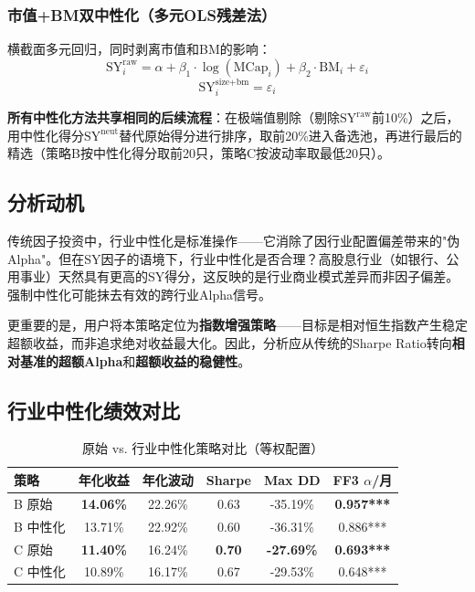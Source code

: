 \documentclass[10pt,a4paper]{ctexart}
\begin{document}
\subsubsection{市值+BM双中性化（多元OLS残差法）}

横截面多元回归，同时剥离市值和BM的影响：
\begin{equation}
\text{SY}_i^{\text{raw}} = \alpha + \beta_1 \cdot \log(\text{MCap}_i) + \beta_2 \cdot \text{BM}_i + \varepsilon_i
\end{equation}
\begin{equation}
\text{SY}_i^{\text{size+bm}} = \varepsilon_i
\end{equation}

\textbf{所有中性化方法共享相同的后续流程}：在极端值剔除（剔除$\text{SY}^{\text{raw}}$前10\%）之后，用中性化得分$\text{SY}^{\text{neut}}$替代原始得分进行排序，取前20\%进入备选池，再进行最后的精选（策略B按中性化得分取前20只，策略C按波动率取最低20只）。

\subsection{分析动机}

传统因子投资中，行业中性化是标准操作——它消除了因行业配置偏差带来的"伪Alpha"。但在SY因子的语境下，行业中性化是否合理？高股息行业（如银行、公用事业）天然具有更高的SY得分，这反映的是行业商业模式差异而非因子偏差。强制中性化可能抹去有效的跨行业Alpha信号。

更重要的是，用户将本策略定位为\textbf{指数增强策略}——目标是相对恒生指数产生稳定超额收益，而非追求绝对收益最大化。因此，分析应从传统的Sharpe Ratio转向\textbf{相对基准的超额Alpha}和\textbf{超额收益的稳健性}。

\subsection{行业中性化绩效对比}

\begin{table}[htbp]
\centering
\caption{原始 vs. 行业中性化策略对比（等权配置）}
\begin{tabular}{lccccc}
\toprule
\textbf{策略} & \textbf{年化收益} & \textbf{年化波动} & \textbf{Sharpe} & \textbf{Max DD} & \textbf{FF3 $\alpha$/月} \\
\midrule
B 原始 & \textbf{14.06\%} & 22.26\% & 0.63 & -35.19\% & \textbf{0.957***} \\
B 中性化 & 13.71\% & 22.92\% & 0.60 & -36.31\% & 0.886*** \\
\hline
C 原始 & \textbf{11.40\%} & 16.24\% & \textbf{0.70} & \textbf{-27.69\%} & \textbf{0.693***} \\
C 中性化 & 10.89\% & 16.17\% & 0.67 & -29.53\% & 0.648*** \\
\bottomrule
\end{tabular}
\end{table}
\end{document}
